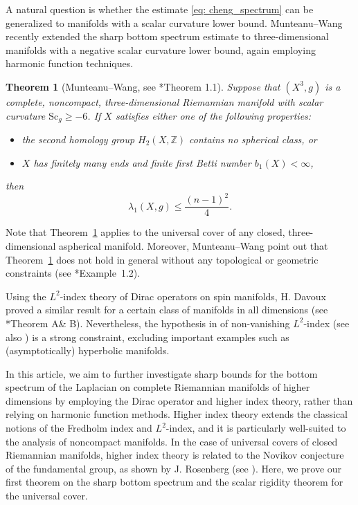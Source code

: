 \documentclass[12pt, reqno]{amsart}
\theoremstyle{plain}%
\newtheorem{theorem}{Theorem}[section]
\theoremstyle{definition}
\theoremstyle{remark}
\numberwithin{equation}{section}
\newcommand{\Sc}{\mathrm{Sc}}
\begin{document}
A natural question is whether the estimate \eqref{eq: cheng_spectrum} can be generalized to manifolds with a scalar curvature lower bound.  Munteanu--Wang recently extended the sharp bottom spectrum estimate to three-dimensional manifolds with a negative scalar curvature lower bound, again employing harmonic function techniques.

\begin{theorem}[Munteanu--Wang, see \cite{MunteanuWang}*{Theorem 1.1}] \label{thm: mw_bottom_spectrum}
  Suppose that  $(X^3,g)$ is a complete, noncompact, three-dimensional Riemannian manifold with scalar curvature $\Sc_g \geq -6$. If $X$ satisfies either one of the following properties:
\begin{itemize}
	\item the second homology group $H_2(X, \mathbb{Z})$ contains no spherical class, or
	\item $X$ has finitely many ends and finite first Betti number $b_1(X) < \infty$,
\end{itemize}
then \[\lambda_1(X,g) \leq \frac{(n-1)^2}{4}.\]  
\end{theorem}
Note that Theorem~\ref{thm: mw_bottom_spectrum} applies to the universal cover of any closed, three-dimensional aspherical manifold. Moreover, Munteanu--Wang point out that Theorem~\ref{thm: mw_bottom_spectrum} does not hold in general without any topological or geometric constraints (see \cite{MunteanuWang}*{Example~1.2}).


Using the $L^2$-index theory of Dirac operators on spin manifolds, H. Davoux proved a similar result for a certain class of manifolds in all dimensions (see \cite{Davaux}*{Theorem A\& B}).
Nevertheless, the hypothesis in \cite{Davaux} of non-vanishing $L^2$-index (see also \cite{MR3275037}) is a strong constraint, excluding important examples such as  (asymptotically) hyperbolic manifolds. 


In this article, we aim to further investigate sharp bounds for the bottom spectrum of the Laplacian on complete Riemannian manifolds of higher dimensions by employing the Dirac operator and higher index theory, rather than relying on harmonic function methods. Higher index theory \cites{BaumConnesHigson,MR0996437,Roe} extends the classical notions of the Fredholm index and $L^2$-index, and it is particularly well-suited to the analysis of noncompact manifolds. In the case of universal covers of closed Riemannian manifolds, higher index theory is related to the Novikov conjecture of the fundamental group, as shown by J. Rosenberg (see \cite{MR720934}).
Here, we prove our first theorem on the sharp bottom spectrum and the scalar rigidity theorem for the universal cover.
\end{document}

